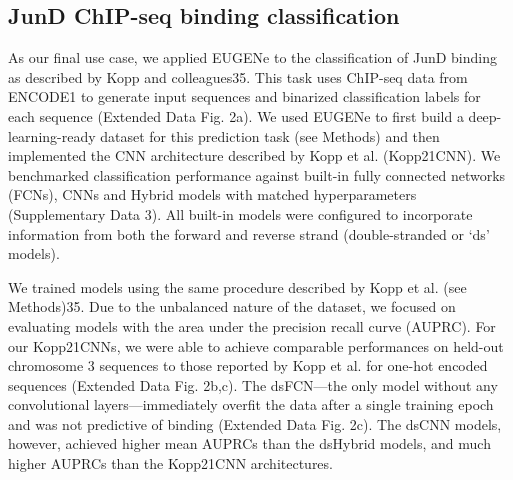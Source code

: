 \subsection{JunD ChIP-seq binding classification}

As our final use case, we applied EUGENe to the classification of JunD binding as described by Kopp and colleagues35. This task uses ChIP-seq data from ENCODE1 to generate input sequences and binarized classification labels for each sequence (Extended Data Fig. 2a). We used EUGENe to first build a deep-learning-ready dataset for this prediction task (see Methods) and then implemented the CNN architecture described by Kopp et al. (Kopp21CNN). We benchmarked classification performance against built-in fully connected networks (FCNs), CNNs and Hybrid models with matched hyperparameters (Supplementary Data 3). All built-in models were configured to incorporate information from both the forward and reverse strand (double-stranded or ‘ds’ models).

We trained models using the same procedure described by Kopp et al. (see Methods)35. Due to the unbalanced nature of the dataset, we focused on evaluating models with the area under the precision recall curve (AUPRC). For our Kopp21CNNs, we were able to achieve comparable performances on held-out chromosome 3 sequences to those reported by Kopp et al. for one-hot encoded sequences (Extended Data Fig. 2b,c). The dsFCN—the only model without any convolutional layers—immediately overfit the data after a single training epoch and was not predictive of binding (Extended Data Fig. 2c). The dsCNN models, however, achieved higher mean AUPRCs than the dsHybrid models, and much higher AUPRCs than the Kopp21CNN architectures.

